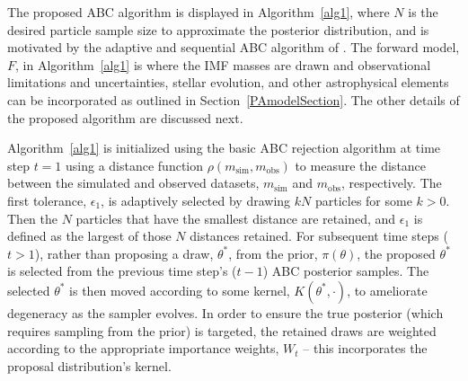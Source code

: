 \documentclass[ejs]{imsart}
\numberwithin{equation}{section}
\theoremstyle{plain}
\newcommand{\msim}{m_{\text{sim}}}
\newcommand{\mobs}{m_{\text{obs}}}
\begin{document}
The proposed ABC algorithm is displayed in Algorithm~\eqref{alg1}, where $N$ is the desired particle sample size to approximate the posterior distribution, and is motivated by the adaptive and sequential ABC algorithm of \cite{beaumont2009}.  
The forward model, $F$, in Algorithm~\eqref{alg1} is where the IMF masses are drawn and observational limitations and uncertainties, stellar evolution, and other astrophysical elements can be incorporated as outlined in Section~\ref{PAmodelSection}.  The other details of the proposed algorithm are discussed next.

Algorithm~\eqref{alg1} is initialized using the basic ABC rejection algorithm at time step $t = 1$ using a distance function $\rho(\msim, \mobs)$ to measure the distance between the simulated and observed datasets, $\msim$ and $\mobs$, respectively.  The first tolerance, $\epsilon_1$, is adaptively selected by drawing $kN$ particles for some $k >0$.  Then the $N$ particles that have the smallest distance are retained, and $\epsilon_1$ is defined as the largest of those $N$ distances retained.
%
For subsequent time steps ($t > 1$), rather than proposing a draw, $\theta^*$, from the prior, $\pi(\theta)$, the proposed $\theta^*$ is selected from the previous time step's ($t-1$) ABC posterior samples.  The selected $\theta^*$ is then moved according to some kernel, $K(\theta^*, \cdot)$, to ameliorate degeneracy as the sampler evolves.  In order to ensure the true posterior (which requires sampling from the prior) is targeted, the retained draws are weighted according to the appropriate importance weights, $W_t$ -- this incorporates the proposal distribution's kernel.
\end{document}
